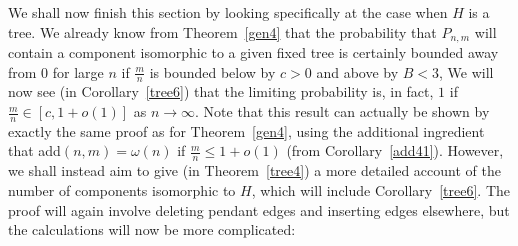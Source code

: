\documentclass{article}
\newtheorem{Proof of Theorem}{Proof of Theorem}
\begin{document}
We shall now finish this section by looking specifically at the case when $H$ is a tree.
We already know from Theorem~\ref{gen4} that 
the probability that $P_{n,m}$ will contain a component isomorphic to a given fixed tree 
is certainly bounded away from $0$ for large $n$ 
if $\frac{m}{n}$ is bounded below by $c > 0$ and above by $B < 3$,
We will now see (in Corollary~\ref{tree6}) that the limiting probability is, in fact, $1$ 
if $\frac{m}{n} \in [c,1+o(1)]$ as $n \to \infty$.
Note that this result can actually be shown by exactly the same proof as for Theorem~\ref{gen4},
using the additional ingredient that add$(n,m) = \omega(n)$ if $\frac{m}{n} \leq 1 + o(1)$
(from Corollary~\ref{add41}).
However,
we shall instead aim to give (in Theorem~\ref{tree4}) 
a more detailed account of the number of components isomorphic to $H$,
which will include Corollary~\ref{tree6}.
The proof will again involve deleting pendant edges and inserting edges elsewhere,
but the calculations will now be more complicated:
\end{document}
